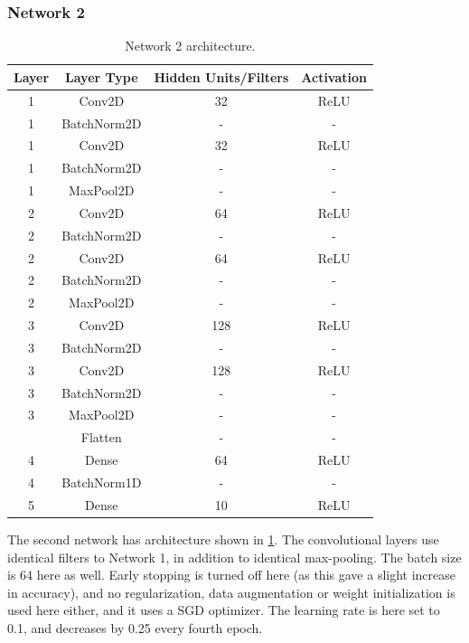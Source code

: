 \subsubsection*{Network 2}

\begin{table}[h!]
    \centering
    \begin{tabular}{|c|c|c|c|}
      \hline
      Layer & Layer Type & Hidden Units/Filters & Activation \\
      \hline
      1 & Conv2D & 32 & ReLU \\
      1 & BatchNorm2D & - & - \\
      1 & Conv2D & 32 & ReLU \\
      1 & BatchNorm2D & - & - \\
      1 & MaxPool2D & - & - \\
      \hline
      2 & Conv2D & 64 & ReLU \\
      2 & BatchNorm2D & - & - \\
      2 & Conv2D & 64 & ReLU \\
      2 & BatchNorm2D & - & - \\
      2 & MaxPool2D & - & - \\
      \hline
      3 & Conv2D & 128 & ReLU \\
      3 & BatchNorm2D & - & - \\
      3 & Conv2D & 128 & ReLU \\
      3 & BatchNorm2D & - & - \\
      3 & MaxPool2D & - & - \\
      \hline
        & Flatten & - & - \\
      \hline
      4 & Dense & 64 & ReLU \\
      4 & BatchNorm1D & - & - \\
      \hline
      5 & Dense & 10 & ReLU \\
      \hline
    \end{tabular}
    \caption{Network 2 architecture.}
    \label{tab:task3:net2}
\end{table}

The second network has architecture shown in \cref{tab:task3:net2}. The convolutional layers use identical filters to Network 1, in addition to identical max-pooling. The batch size is 64 here as well. Early stopping is turned off here (as this gave a slight increase in accuracy), and no regularization, data augmentation or weight initialization is used here either, and it uses a SGD optimizer. The learning rate is here set to 0.1, and decreases by 0.25 every fourth epoch.


